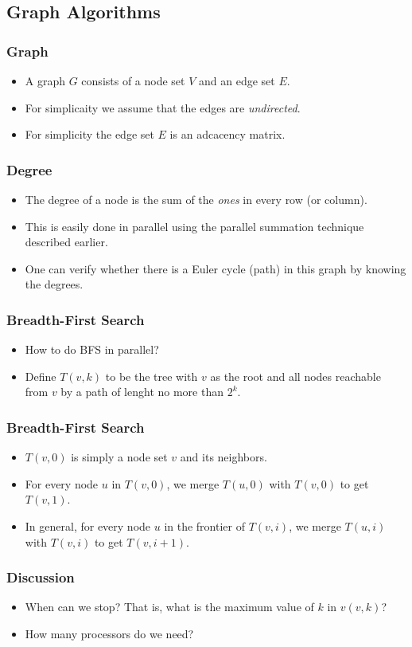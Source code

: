 \documentclass{beamer}
\begin{document}
\begin{CJK}{UTF8}{bsmi}
\subsection{Graph Algorithms}

\begin{frame}
\frametitle{Graph}
\begin{itemize}
\item A graph $G$ consists of a node set $V$ and an edge set $E$.
\item For simplicaity we assume that the edges are {\em undirected}.
\item For simplicity the edge set $E$ is an adcacency matrix.
\end{itemize}
\end{frame}

\begin{frame}
\frametitle{Degree}
\begin{itemize}
\item The degree of a node is the sum of the {\em ones} in every row (or column).
\item This is easily done in parallel using the parallel summation technique described earlier.
\item One can verify whether there is a Euler cycle (path) in this graph by knowing the degrees.
\end{itemize}
\end{frame}

\begin{frame}
\frametitle{Breadth-First Search}
\begin{itemize}
\item How to do BFS in parallel?
\item Define $T(v, k)$ to be the tree with $v$ as the root and all nodes reachable from $v$ by a path of lenght no more than $2^k$.
\end{itemize}
\end{frame}

\begin{frame}
\frametitle{Breadth-First Search}
\begin{itemize}
\item $T(v, 0)$ is simply a node set $v$ and its neighbors.
\item For every node $u$ in $T(v, 0)$, we merge $T(u, 0)$ with $T(v,0)$ to get $T(v, 1)$.
\item In general, for every node $u$ in the frontier of $T(v, i)$, we merge $T(u, i)$ with $T(v, i)$ to get $T(v, i + 1)$.
\end{itemize}
\end{frame}


\begin{frame}
\frametitle{Discussion}
\begin{itemize}
\item When can we stop?
  That is, what is the maximum value of $k$ in $v(v, k)$?
\item How many processors do we need?
\end{itemize}
\end{frame}






\end{CJK}
\end{document}
